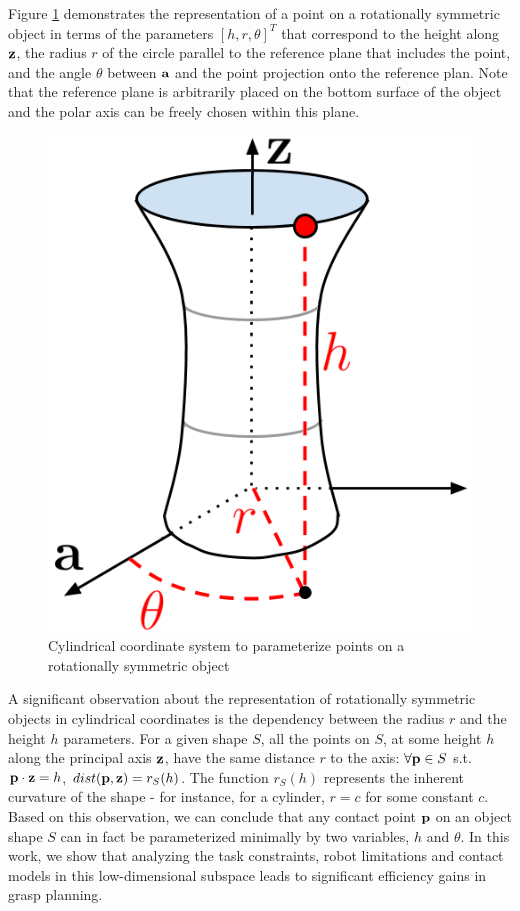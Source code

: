 \documentclass[a4paper,10pt,twocolumn]{article}
\begin{document}
Figure \ref{fig:representation} demonstrates the representation
of a point on a rotationally symmetric object in terms of the parameters $[h, r, \theta]^T$
that correspond to the height along $\textbf{z}$, the radius $r$ of the circle parallel to the
reference plane that includes the point, and the angle $\theta$ between $\textbf{a}$ and the point
projection onto the reference plan. Note that the reference plane is arbitrarily placed 
on the bottom surface of the object and the polar axis can be freely chosen within this plane. 

\begin{figure}[t]
  \begin{center}
    \includegraphics[width=0.5\linewidth]{./images/representation.png} \quad 
  \end{center}
  \caption{Cylindrical coordinate system to parameterize points on a rotationally symmetric object}
  \label{fig:representation}
\end{figure}

A significant observation about the representation of rotationally symmetric objects in cylindrical
coordinates is the dependency between the radius $r$ and the height $h$ parameters. For a given shape $S$,
all the points on $S$, at some height $h$ along the principal axis $\textbf{z}$, have the same distance
$r$ to the axis: $\forall \textbf{p} \in S$ s.t. $\textbf{p} \cdot \textbf{z} = h$, $dist(\textbf{p}, \textbf{z}) = r_S(h)$. The
function $r_S(h)$ represents the inherent curvature of the shape - for instance, for a cylinder, $r
= c$ for some constant $c$. Based on this observation, we can conclude that any contact point $\textbf{p}$ on
an object shape $S$ can in fact be parameterized minimally by two variables, $h$ and $\theta$.
In this work, we show that analyzing the task constraints, robot limitations and contact models 
in this low-dimensional subspace leads to significant efficiency gains in grasp planning.
\end{document}
